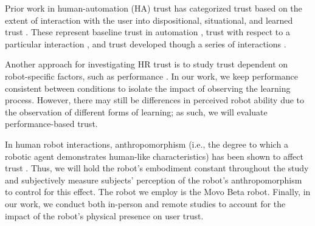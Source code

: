 \documentclass[letterpaper]{article} %
\begin{document}
Prior work in human-automation (HA) trust has categorized trust based on the extent of interaction with the user into dispositional, situational, and learned trust \cite{hoff_trust_2015}. These represent baseline trust in automation \cite{merritt_i_2013}, trust with respect to a particular interaction \cite{jian_foundations_2000}, and trust developed though a series of interactions \cite{de_visser_towards_2020}.

Another approach for investigating HR trust is to study trust dependent on robot-specific factors, such as performance \cite{hedlund_effects_2021}. In our work, we keep performance consistent between conditions to isolate the impact of observing the learning process. However, there may still be differences in perceived robot ability due to the observation of different forms of learning; as such, we will evaluate performance-based trust.

In human robot interactions, anthropomorphism (i.e., the degree to which a robotic agent demonstrates human-like characteristics) has been shown to affect trust \cite{3374839}. Thus, we will hold the robot's embodiment constant throughout the study and subjectively measure subjects' perception of the robot's anthropomorphism to control for this effect. The robot we employ is the Movo Beta robot. Finally, in our work, we conduct both in-person and remote studies to account for the impact of the robot's physical presence on user trust.


\end{document}
